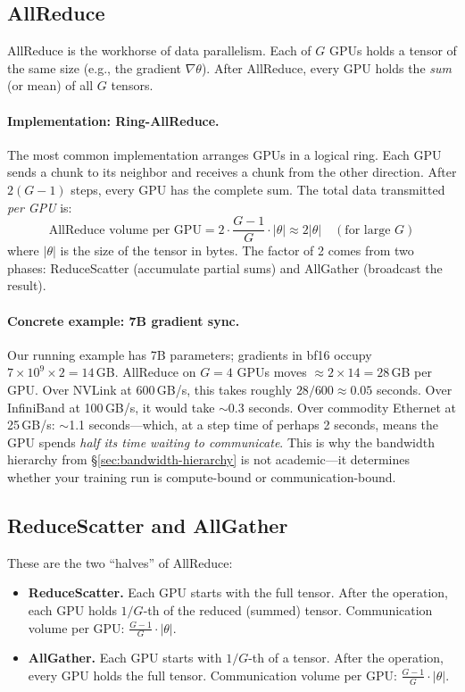 \subsection{AllReduce}

AllReduce is the workhorse of data parallelism. Each of $G$ GPUs holds a tensor of the same size (e.g., the gradient $\nabla\theta$). After AllReduce, every GPU holds the \emph{sum} (or mean) of all $G$ tensors.

\paragraph{Implementation: Ring-AllReduce.} The most common implementation arranges GPUs in a logical ring. Each GPU sends a chunk to its neighbor and receives a chunk from the other direction. After $2(G-1)$ steps, every GPU has the complete sum. The total data transmitted \emph{per GPU} is:
\[
  \text{AllReduce volume per GPU} = 2 \cdot \frac{G-1}{G} \cdot |\theta| \approx 2|\theta| \quad (\text{for large } G)
\]
where $|\theta|$ is the size of the tensor in bytes. The factor of 2 comes from two phases: ReduceScatter (accumulate partial sums) and AllGather (broadcast the result).

\paragraph{Concrete example: 7B gradient sync.} Our running example has 7B parameters; gradients in bf16 occupy $7 \times 10^9 \times 2 = 14$\,GB. AllReduce on $G = 4$ GPUs moves $\approx 2 \times 14 = 28$\,GB per GPU. Over NVLink at 600\,GB/s, this takes roughly $28 / 600 \approx 0.05$ seconds. Over InfiniBand at 100\,GB/s, it would take $\sim$0.3 seconds. Over commodity Ethernet at 25\,GB/s: $\sim$1.1 seconds---which, at a step time of perhaps 2 seconds, means the GPU spends \emph{half its time waiting to communicate}. This is why the bandwidth hierarchy from \S\ref{sec:bandwidth-hierarchy} is not academic---it determines whether your training run is compute-bound or communication-bound.

\subsection{ReduceScatter and AllGather}

These are the two ``halves'' of AllReduce:

\begin{itemize}[nosep]
  \item \textbf{ReduceScatter.} Each GPU starts with the full tensor. After the operation, each GPU holds $1/G$-th of the reduced (summed) tensor. Communication volume per GPU: $\frac{G-1}{G} \cdot |\theta|$.
  \item \textbf{AllGather.} Each GPU starts with $1/G$-th of a tensor. After the operation, every GPU holds the full tensor. Communication volume per GPU: $\frac{G-1}{G} \cdot |\theta|$.
\end{itemize}

